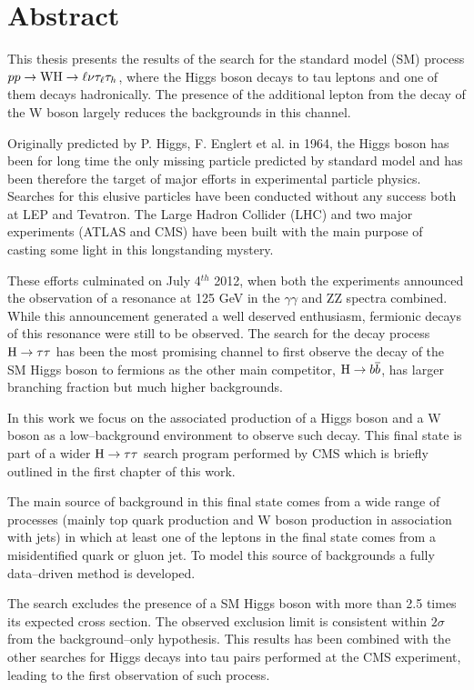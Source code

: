 \chapter*{Abstract}

This thesis presents the results of the search for the standard model (SM) process $pp \rightarrow \mathrm{W}\mathrm{H} \rightarrow \ell \nu \tau_\ell \tau_h$, where the Higgs boson decays to tau leptons and one of them decays hadronically. The presence of the additional lepton from the decay of the W boson largely reduces the backgrounds in this channel.

Originally predicted by P. Higgs, F. Englert et al. in 1964, the Higgs boson has been for long time the only missing particle predicted by standard model and has been therefore the target of major efforts in experimental particle physics. Searches for this elusive particles have been conducted without any success both at LEP and Tevatron. The Large Hadron Collider (LHC) and two major experiments (ATLAS and CMS) have been built with the main purpose of casting some light in this longstanding mystery. 

These efforts culminated on July 4$^{th}$ 2012, when both the experiments announced the observation of a resonance at 125 GeV in the $\gamma \gamma$ and ZZ spectra combined. While this announcement generated a well deserved enthusiasm, fermionic decays of this resonance were still to be observed. The search for the decay process $\mathrm{H} \rightarrow \tau \tau$ has been the most promising channel to first observe the decay of the SM Higgs boson to fermions as the other main competitor, $\mathrm{H} \rightarrow b\overline{b}$, has larger branching fraction but much higher backgrounds. 

In this work we focus on the associated production of a Higgs boson and a W boson as a low--background environment to observe such decay. This final state is part of a wider $\mathrm{H} \rightarrow \tau \tau$ search program performed by CMS which is briefly outlined in the first chapter of this work. 

The main source of background in this final state comes from a wide range of processes (mainly top quark production and W boson production in association with jets) in which at least one of the leptons in the final state comes from a misidentified quark or gluon jet. To model this source of backgrounds a fully data--driven method %
is developed.

The search excludes the presence of a SM Higgs boson with more than 2.5 times its expected cross section. The observed exclusion limit is consistent within $2\sigma$ from the  background--only hypothesis. This results has been combined with the other searches for Higgs decays into tau pairs performed at the CMS experiment, leading to the first observation of such process.